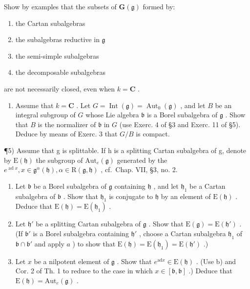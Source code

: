Show by examples that the subsets of \(\mathbf{G}(\mathfrak{g})\) formed by:

\begin{enumerate}
\def\labelenumi{(\roman{enumi})}
\setcounter{enumi}{5}
\item
  the Cartan subalgebras
\item
  the subalgebras reductive in \(\mathfrak{g}\)
\item
  the semi-simple subalgebras
\item
  the decomposable subalgebras
\end{enumerate}

are not necessarily closed, even when \(k = \mathbf{C}\) .

\begin{enumerate}
\def\labelenumi{\arabic{enumi})}
\setcounter{enumi}{3}
\tightlist
\item
  Assume that \(k = \mathbf{C}\) . Let \(G = \operatorname{Int}(\mathfrak{g}) = \operatorname{Aut}_0(\mathfrak{g})\) , and let \(B\) be an integral subgroup of \(G\) whose Lie algebra \(\mathfrak{b}\) is a Borel subalgebra of \(\mathfrak{g}\) . Show that \(B\) is the normalizer of \(\mathfrak{b}\) in \(G\) (use Exerc. 4 of §3 and Exerc. 11 of §5). Deduce by means of Exerc. 3 that \(G / B\) is compact.
\end{enumerate}

¶5) Assume that g is splittable. If h is a splitting Cartan subalgebra of g, denote by \(\mathrm{E}(\mathfrak{h})\) the subgroup of \(\mathrm{Aut}_{e}(\mathfrak{g})\) generated by the \(e^{\operatorname{ad} x}, x \in \mathfrak{g}^{\alpha}(\mathfrak{h}), \alpha \in \mathrm{R}(\mathfrak{g}, \mathfrak{h})\) , cf.~Chap. VII, §3, no. 2.

\begin{enumerate}
\def\labelenumi{\alph{enumi})}
\item
  Let \(\mathfrak{b}\) be a Borel subalgebra of \(\mathfrak{g}\) containing \(\mathfrak{h}\) , and let \(\mathfrak{h}_1\) be a Cartan subalgebra of \(\mathfrak{b}\) . Show that \(\mathfrak{h}_1\) is conjugate to \(\mathfrak{h}\) by an element of \(\mathrm{E}(\mathfrak{h})\) . Deduce that \(\mathrm{E}(\mathfrak{h}) = \mathrm{E}(\mathfrak{h}_1)\) .
\item
  Let \(\mathfrak{h}'\) be a splitting Cartan subalgebra of \(\mathfrak{g}\) . Show that \(\mathrm{E}(\mathfrak{g}) = \mathrm{E}(\mathfrak{h}')\) . (If \(\mathfrak{b}'\) is a Borel subalgebra containing \(\mathfrak{h}'\) , choose a Cartan subalgebra \(\mathfrak{h}_1\) of \(\mathfrak{b} \cap \mathfrak{b}'\) and apply \(a\) ) to show that \(\mathrm{E}(\mathfrak{h}) = \mathrm{E}(\mathfrak{h}_1) = \mathrm{E}(\mathfrak{h}')\) .)
\item
  Let \(x\) be a nilpotent element of \(\mathfrak{g}\) . Show that \(e^{\mathrm{ad}x} \in \mathrm{E}(\mathfrak{h})\) . (Use b) and Cor. 2 of Th. 1 to reduce to the case in which \(x \in [\mathfrak{b}, \mathfrak{b}]\) .) Deduce that \(\mathrm{E}(\mathfrak{h}) = \mathrm{Aut}_e(\mathfrak{g})\) .
\end{enumerate}

